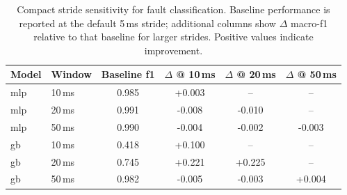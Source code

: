 \begin{table}[pos=ht]
\caption{Compact stride sensitivity for fault classification. Baseline performance is reported at the default 5\,ms stride; additional columns show $\Delta$ macro-\ac{f1} relative to that baseline for larger strides. Positive values indicate improvement.}
\small
\label{tab:fc_stride_sensitivity}
\centering
\begin{tabular}{llcccc}
\toprule
\textbf{Model} & \textbf{Window} & \textbf{Baseline \acs{f1}} & \textbf{$\Delta$ @ 10\,ms} & \textbf{$\Delta$ @ 20\,ms} & \textbf{$\Delta$ @ 50\,ms} \\
\midrule
\ac{mlp} & 10\,ms & 0.985 & +0.003 & -- & -- \\
\ac{mlp} & 20\,ms & 0.991 & -0.008 & -0.010 & -- \\
\ac{mlp} & 50\,ms & 0.990 & -0.004 & -0.002 & -0.003 \\
\midrule
\ac{gb} & 10\,ms & 0.418 & +0.100 & -- & -- \\
\ac{gb} & 20\,ms & 0.745 & +0.221 & +0.225 & -- \\
\ac{gb} & 50\,ms & 0.982 & -0.005 & -0.003 & +0.004 \\
\bottomrule
\end{tabular}
\end{table}
